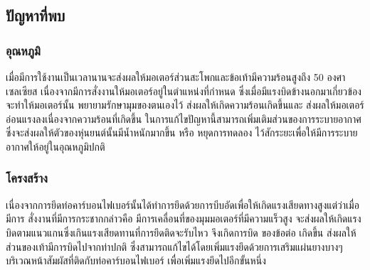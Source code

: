 

\clearpage
\subsection{ปัญหาที่พบ}
\subsubsection{อุณหภูมิ}
เมื่อมีการใช้งานเป็นเวลานานจะส่งผลให้มอเตอร์ส่วนสะโพกและข้อเท้ามีความร้อนสูงถึง 50 องศาเซลเซียส 
เนื่องจากมีการสั่งงานให้มอเตอร์อยู่ในตำแหน่งที่กำหนด ซึ่งเมื่อมีแรงบิดข้างนอกมาเกี่ยวข้อง จะทำให้มอเตอร์นั้น
พยายามรักษามุมของตนเองไว้ ส่งผลให้เกิดความร้อนเกิดขึ้นและ ส่งผลให้มอเตอร์อ่อนแรงลงเนื่องจากความร้อนที่เกิดขึ้น 
ในการแก้ไขปัญหานี้สามารถเพิ่มเติมส่วนของการระบายอากาศซึ่งจะส่งผลให้ตัวของหุ่นยนต์นั้นมีน้ำหนักมากขึ้น หรือ หยุดการทดลอง
ไว้สักระยะเพื่อให้มีการระบายอากาศให้อยู่ในอุณหภูมิปกติ
\subsubsection{โครงสร้าง}
เนื่องจากการยึดท่อคาร์บอนไฟเบอร์นั้นได้ทำการยึดด้วยการบีบอัดเพื่อให้เกิดแรงเสียดทางสูงแต่ว่าเมื่อมีการ สั่งงานที่มีการกระชากกล่าวคือ
มีการเคลื่อนที่ของมุมมอเตอร์ที่มีความแร็วสูง จะส่งผลให้เกิดแรงบิดตามแนวแกนซึ่งเกินแรงเสียดทานที่การยึดติดจะรับไหว จึงเกิดการบิด ของข้อต่อ
เกิดขึ้น ส่งผลให้ ส่วนของเท้ามีการบิดไปจากท่าปกติ ซึ่งสามารถแก้ไขได้โดยเพิ่มแรงยึดด้วยการเสริมแผ่นยางบางๆบริเวณหน้าสัมผัสที่ติดกับท่อคาร์บอนไฟเบอร์
เพื่อเพิ่มแรงยึดไปอีกขั้นหนึ่ง 


